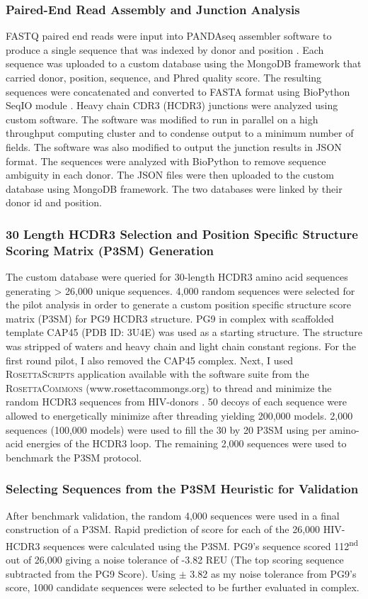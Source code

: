 \subsubsection{Paired-End Read Assembly and Junction Analysis}
FASTQ paired end reads were input into PANDAseq assembler software to produce a single sequence that was indexed by donor and position \citep{Bartram:2011cz}. Each sequence was uploaded to a custom database using the MongoDB framework that carried donor, position, sequence, and Phred quality score. The resulting sequences were concatenated and converted to FASTA format using BioPython SeqIO module \citep{Cock:2009hj}. Heavy chain CDR3 (HCDR3) junctions were analyzed using custom software. The software was modified to run in parallel on a high throughput computing cluster and to condense output to a minimum number of fields. The software was also modified to output the junction results in JSON format. The sequences were analyzed with BioPython to remove sequence ambiguity in each donor. The JSON files were then uploaded to the custom database using MongoDB framework. The two databases were linked by their donor id and position.

\subsubsection{30 Length HCDR3 Selection and Position Specific Structure Scoring Matrix (P3SM) Generation}
The custom database were queried for 30-length HCDR3 amino acid sequences generating > 26,000 unique sequences. 4,000 random sequences were selected for the pilot analysis in order to generate a custom position specific structure score matrix (P3SM) for PG9 HCDR3 structure. PG9 in complex with scaffolded template CAP45 (PDB ID: 3U4E) was used as a starting structure. The structure was stripped of waters and heavy chain and light chain constant regions. For the first round pilot, I also removed the CAP45 complex. Next, I used R\textsc{osetta}S\textsc{cripts} application available with the software suite from the R\textsc{osetta}C\textsc{ommons} (www.rosettacommongs.org) to thread and minimize the random HCDR3 sequences from HIV-\naive donors \citep{Fleishman:2011ji}. 50 decoys of each sequence were allowed to energetically minimize after threading yielding 200,000 models. 2,000 sequences (100,000 models) were used to fill the 30 by 20 P3SM using \rosetta per amino-acid energies of the HCDR3 loop. The remaining 2,000 sequences were used to benchmark the P3SM protocol.

\subsubsection{Selecting Sequences from the P3SM Heuristic for Validation}
After benchmark validation, the random 4,000 sequences were used in a final construction of a P3SM. Rapid prediction of score for each of the 26,000 HIV-\naive HCDR3 sequences were calculated using the P3SM. PG9's sequence scored 112\textsuperscript{nd} out of 26,000 giving a noise tolerance of -3.82 REU (The top scoring sequence subtracted from the PG9 Score). Using $\pm$ 3.82 as my noise tolerance from PG9's score, 1000 candidate sequences were selected to be further evaluated in complex.

